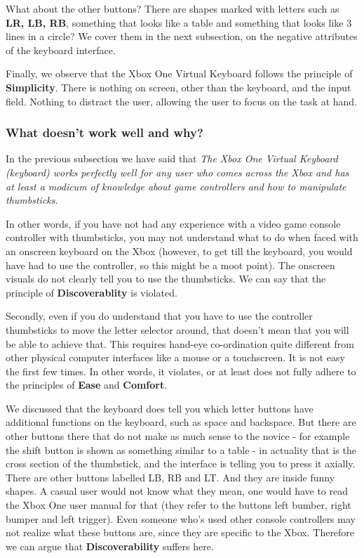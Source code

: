 \documentclass[
	letterpaper, %
]{jdf}
\begin{document}
What about the other buttons? There are shapes marked with letters such as \textbf{LR, LB, RB}, something that looks like a table and something that looks like 3 lines in a circle? We cover them in the next subsection, on the negative attributes of the keyboard interface.

Finally, we observe that the Xbox One Virtual Keyboard follows the principle of \textbf{Simplicity}. There is nothing on screen, other than the keyboard, and the input field. Nothing to distract the user, allowing the user to focus on the task at hand.


\subsubsection{What doesn't work well and why?}
In the previous subsection we have said that \textit{The Xbox One Virtual Keyboard (keyboard) works perfectly well for any user who comes across the Xbox and has at least a modicum of knowledge about game controllers and how to manipulate thumbsticks}.

In other words, if you have not had any experience with a video game console controller with thumbsticks, you may not understand what to do when faced with an onscreen keyboard on the Xbox (however, to get till the keyboard, you would have had to use the controller, so this might be a moot point). The onscreen visuals do not clearly tell you to use the thumbsticks. We can say that the principle of \textbf{Discoverablity} is violated.

Secondly, even if you do understand that you have to use the controller thumbsticks to move the letter selector around, that doesn't mean that you will be able to achieve that. This requires hand-eye co-ordination quite different from other physical computer interfaces like a mouse or a touchscreen. It is not easy the first few times. In other words, it violates, or at least does not fully adhere to the principles of \textbf{Ease} and \textbf{Comfort}.

We discussed that the keyboard does tell you which letter buttons have additional functions on the keyboard, such as space and backspace. But there are other buttons there that do not make as much sense to the novice - for example the shift button is shown as something similar to a table - in actuality that is the cross section of the thumbstick, and the interface is telling you to press it axially. There are other buttons labelled LB, RB and LT. And they are inside funny shapes. A casual user would not know what they mean, one would have to read the Xbox One user manual for that (they refer to the buttons left bumber, right bumper and left trigger). Even someone who's used other console controllers may not realize what these buttons are, since they are specific to the Xbox. Therefore we can argue that \textbf{Discoverability} suffers here.
\end{document}
